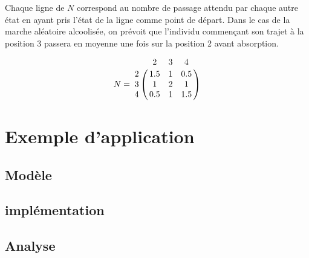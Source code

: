 \documentclass[12pt]{article}
\begin{document}
Chaque ligne de $N$ correspond au nombre de passage attendu par chaque
autre état en ayant pris l'état de la ligne comme point de
départ. Dans le cas de la marche aléatoire alcoolisée, on prévoit que
l'individu commençant son trajet à la position 3 passera en moyenne
une fois sur la position 2 avant absorption.

$$
N =
\bordermatrix{
  & 2 & 3 & 4 \cr
  2 & 1.5 & 1 & 0.5 \cr
  3 & 1 & 2 & 1 \cr
  4 & 0.5 & 1 & 1.5
}
$$

\section{Exemple d'application}

\subsection{Modèle}

\subsection{implémentation}

\subsection{Analyse}



\end{document}
